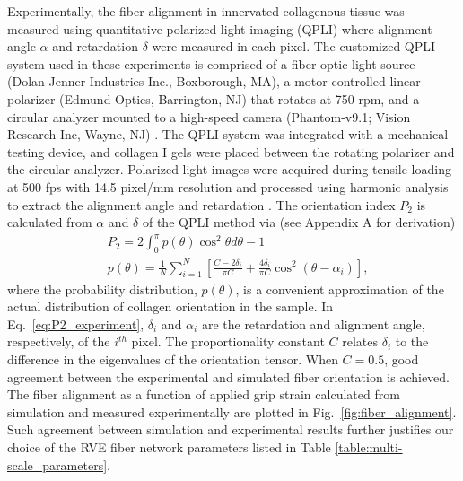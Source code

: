 \documentclass[]{interact}
\begin{document}
Experimentally, the fiber alignment in innervated collagenous tissue was measured using quantitative polarized light imaging (QPLI) \citep{Quinn:2008df,Quinn:2009bf} where alignment angle $\alpha$ and retardation $\delta$ were measured in each pixel. The customized QPLI system used in these experiments \citep{Zhang:2016ga} is comprised of a fiber-optic light source (Dolan-Jenner Industries Inc., Boxborough, MA), a motor-controlled linear polarizer (Edmund Optics, Barrington, NJ) that rotates at 750 rpm, and a circular analyzer mounted to a high-speed camera (Phantom-v9.1; Vision Research Inc, Wayne, NJ) \citep{Zhang:2016ga}. The QPLI system was integrated with a mechanical testing device, and collagen I gels were placed between the rotating polarizer and the circular analyzer. Polarized light images were acquired during tensile loading at 500 fps with 14.5 pixel/mm resolution and processed using harmonic analysis to extract the alignment angle and retardation \citep{Tower:2002hk,Quinn:2008df}. The orientation index $P_2$ is calculated from $\alpha$ and $\delta$ of the QPLI method via (see Appendix A for derivation)
%
\begin{align}
&P_2 = 2 \int_0^{\pi} p(\theta) \cos^2\theta d\theta - 1 \nonumber\\
&p(\theta) = \frac{1}{N} \sum_{i=1}^N \left[ \frac{C-2\delta_i}{\pi C} + \frac{4 \delta_i}{\pi C} \cos^2(\theta - \alpha_i)\right],
\label{eq:P2_experiment}
\end{align}
%
where the probability distribution, $p(\theta)$, is a convenient approximation of the actual distribution of collagen orientation in the sample. In Eq.\ \eqref{eq:P2_experiment}, $\delta_i$ and $\alpha_i$ are the retardation and alignment angle, respectively, of the $i^{th}$ pixel. The proportionality constant $C$ relates $\delta_i$ to the difference in the eigenvalues of the orientation tensor. When $C=0.5$, good agreement between the experimental and simulated fiber orientation is achieved. The fiber alignment as a function of applied grip strain calculated from simulation and measured experimentally are plotted in Fig.\ \ref{fig:fiber_alignment}. Such agreement between simulation and experimental results further justifies our choice of the RVE fiber network parameters listed in Table \ref{table:multi-scale_parameters}.
%
\end{document}
